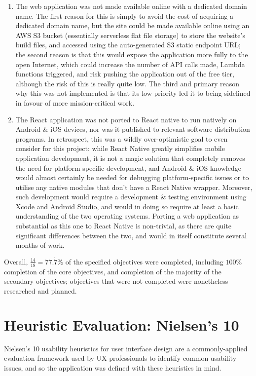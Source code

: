 \documentclass[a4paper,11pt]{report}
\begin{document}
\begin{enumerate}
    \item   The web application was not made available online with a dedicated domain name.
            The first reason for this is simply to avoid the cost of acquiring a dedicated domain name, but the site could be made available online using an AWS S3 bucket\supercite{s3} (essentially serverless flat file storage) to store the website's build files, and accessed using the auto-generated S3 static endpoint URL;
            the second reason is that this would expose the application more fully to the open Internet, which could increase the number of API calls made, Lambda functions triggered, and risk pushing the application out of the free tier, although the risk of this is really quite low.
            The third and primary reason why this was not implemented is that its low priority led it to being sidelined in favour of more mission-critical work.

    \item   The React application was not ported to React native to run natively on Android \& iOS devices, nor was it published to relevant software distribution programs.
            In retrospect, this was a wildly over-optimistic goal to even consider for this project:
            while React Native greatly simplifies mobile application development, it is not a magic solution that completely removes the need for platform-specific development, and Android \& iOS knowledge would almost certainly be needed for debugging platform-specific issues or to utilise any native modules that don't have a React Native wrapper.
            Moreover, such development would require a development \& testing environment using Xcode and Android Studio, and would in doing so require at least a basic understanding of the two operating systems.
            Porting a web application as substantial as this one to React Native is non-trivial, as there are quite significant differences between the two, and would in itself constitute several months of work.
\end{enumerate}

Overall, $\frac{14}{18} = 77.\dot{7} \%$ of the specified objectives were completed, including $100\%$ completion of the core objectives, and completion of the majority of the secondary objectives;
objectives that were not completed were nonetheless researched and planned.

\section{Heuristic Evaluation: Nielsen's 10}
Nielsen's 10 usability heuristics for user interface design are a commonly-applied evaluation framework used by UX professionals to identify common usability issues, and so the application was defined with these heuristics in mind.
\end{document}
